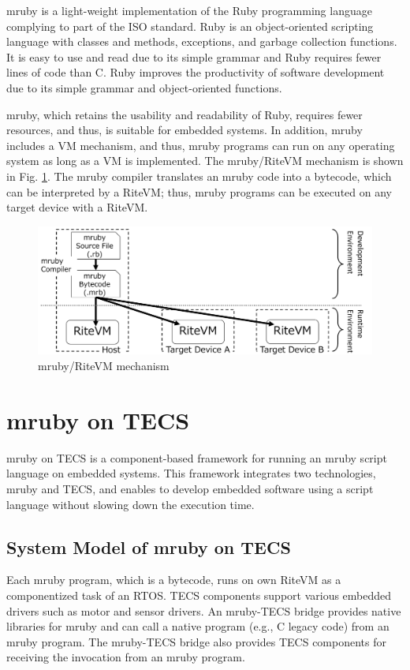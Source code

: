 \documentclass[a4j,12pt,oneside,openany,english]{jsbook}
\begin{document}
mruby is a light-weight implementation of the Ruby programming language complying to part of the ISO standard.
Ruby is an object-oriented scripting language \cite{url:Ruby} with classes and methods, exceptions, and garbage collection functions.
It is easy to use and read due to its simple grammar and Ruby requires fewer lines of code than C.
Ruby improves the productivity of software development due to its simple grammar and object-oriented functions.

mruby, which retains the usability and readability of Ruby, requires fewer resources, and thus, is suitable for embedded systems.
In addition, mruby includes a VM mechanism, and thus, mruby programs can run on any operating system as long as a VM is implemented.
The mruby/RiteVM mechanism is shown in Fig. \ref{fig:mruby}.
The mruby compiler translates an mruby code into a bytecode, which can be interpreted by a RiteVM; thus, mruby programs can be executed on any target device with a RiteVM.

\begin{figure}[t]
    \centering
    \includegraphics[width=12cm,clip]{figure/mruby.pdf}
    \caption{mruby/RiteVM mechanism}
    \label{fig:mruby}
\end{figure}


\section{mruby on TECS}
\label{sec:mrubyonTECS}

mruby on TECS is a component-based framework for running an mruby script language on embedded systems.
This framework integrates two technologies, mruby and TECS, and enables to develop embedded software using a script language without slowing down the execution time. 

\subsection{System Model of mruby on TECS}
Each mruby program, which is a bytecode, runs on own RiteVM as a componentized task of an RTOS.
TECS components support various embedded drivers such as motor and sensor drivers.
An mruby-TECS bridge provides native libraries for mruby and can call a native program (e.g., C legacy code) from an mruby program.
The mruby-TECS bridge also provides TECS components for receiving the invocation from an mruby program.
\end{document}
